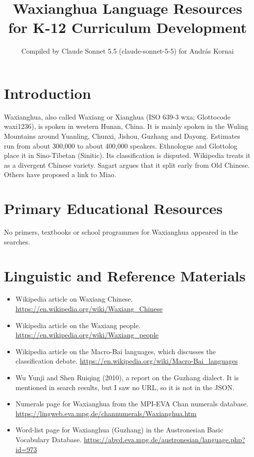 \documentclass[12pt]{article}
\title{Waxianghua Language Resources for K-12 Curriculum Development}
\author{Compiled by Claude Sonnet 5.5 (claude-sonnet-5-5) for Andr\'as Kornai}
\date{}
\begin{document}
\maketitle

\section{Introduction}
Waxianghua, also called Waxiang or Xianghua (ISO 639-3 wxa; Glottocode waxi1236), is spoken in western Hunan, China. It is mainly spoken in the Wuling Mountains around Yuanling, Chunxi, Jishou, Guzhang and Dayong. Estimates run from about 300,000 to about 400,000 speakers. Ethnologue and Glottolog place it in Sino-Tibetan (Sinitic). Its classification is disputed. Wikipedia treats it as a divergent Chinese variety. Sagart argues that it split early from Old Chinese. Others have proposed a link to Miao.

\section{Primary Educational Resources}
No primers, textbooks or school programmes for Waxianghua appeared in the searches.

\section{Linguistic and Reference Materials}
\begin{itemize}
\item Wikipedia article on Waxiang Chinese. \url{https://en.wikipedia.org/wiki/Waxiang_Chinese}
\item Wikipedia article on the Waxiang people. \url{https://en.wikipedia.org/wiki/Waxiang_people}
\item Wikipedia article on the Macro-Bai languages, which discusses the classification debate. \url{https://en.wikipedia.org/wiki/Macro-Bai_languages}
\item Wu Yunji and Shen Ruiqing (2010), a report on the Guzhang dialect. It is mentioned in search results, but I saw no URL, so it is not in the JSON.
\item Numerals page for Waxianghua from the MPI-EVA Chan numerals database. \url{https://lingweb.eva.mpg.de/channumerals/Waxianghua.htm}
\item Word-list page for Waxianghua (Guzhang) in the Austronesian Basic Vocabulary Database. \url{https://abvd.eva.mpg.de/austronesian/language.php?id=973}
\end{itemize}
\end{document}
